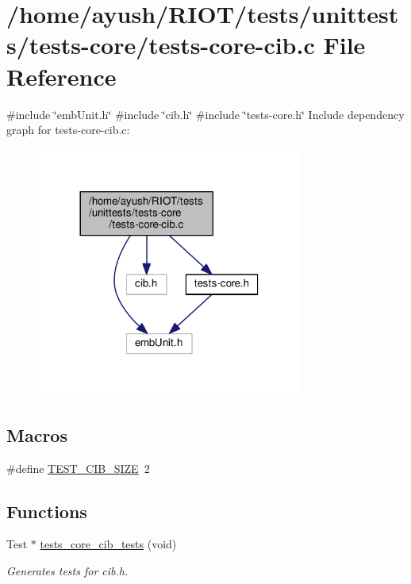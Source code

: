 \hypertarget{tests-core-cib_8c}{}\section{/home/ayush/\+R\+I\+O\+T/tests/unittests/tests-\/core/tests-\/core-\/cib.c File Reference}
\label{tests-core-cib_8c}
{\ttfamily \#include \char`\"{}emb\+Unit.\+h\char`\"{}}\newline
{\ttfamily \#include \char`\"{}cib.\+h\char`\"{}}\newline
{\ttfamily \#include \char`\"{}tests-\/core.\+h\char`\"{}}\newline
Include dependency graph for tests-\/core-\/cib.c\+:
\nopagebreak
\begin{figure}[H]
\begin{center}
\leavevmode
\includegraphics[width=248pt]{tests-core-cib_8c__incl}
\end{center}
\end{figure}
\subsection*{Macros}
\begin{DoxyCompactItemize}
\item 
\#define \hyperlink{tests-core-cib_8c_a8bccb40b92b7a08d569f60c3db3a81c1}{T\+E\+S\+T\+\_\+\+C\+I\+B\+\_\+\+S\+I\+ZE}~2
\end{DoxyCompactItemize}
\subsection*{Functions}
\begin{DoxyCompactItemize}
\item 
Test $\ast$ \hyperlink{group__unittests_gaf6c587a2b7c4b7284754cb254d828ae4}{tests\+\_\+core\+\_\+cib\+\_\+tests} (void)
\begin{DoxyCompactList}\small\item\em Generates tests for cib.\+h. \end{DoxyCompactList}\end{DoxyCompactItemize}


